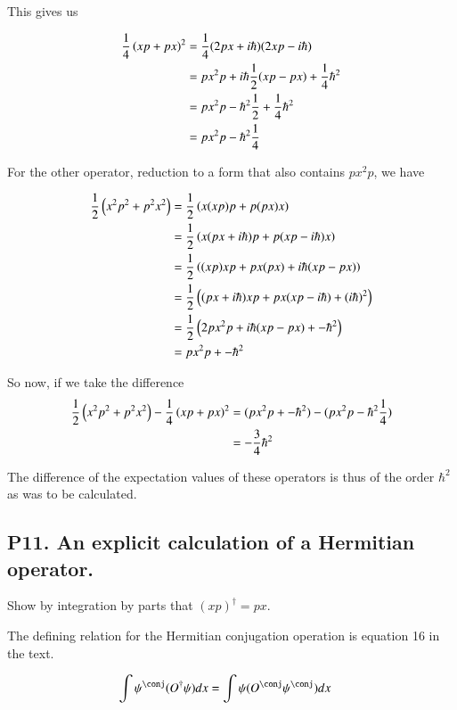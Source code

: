 \documentclass{article}
\begin{document}
This gives us

\begin{align*}
\frac{1}{4}\left(x p + p x \right)^2 
&= \frac{1}{4}(2 p x + i \hbar)( 2 x p - i \hbar ) \\
&= p x^2 p + i\hbar \frac{1}{2}(x p - p x) + \frac{1}{4} \hbar^2 \\
&= p x^2 p - \hbar^2 \frac{1}{2} + \frac{1}{4} \hbar^2 \\
&= p x^2 p - \hbar^2 \frac{1}{4} \\
\end{align*}

For the other operator, reduction to a form that also contains $p x^2 p$, we have

\begin{align*}
\frac{1}{2}\left(x^2 p^2 + p^2 x^2 \right)
&=
\frac{1}{2}\left(x (x p) p + p (p x) x \right) \\
&=
\frac{1}{2}\left(x (p x + i \hbar) p + p (x p -i\hbar) x \right) \\
&=
\frac{1}{2}\left((x p) x p + p x (p x) + i \hbar ( x p - p x ) \right) \\
&=
\frac{1}{2}\left((p x + i\hbar) x p + p x ( x p - i\hbar) + (i \hbar)^2 \right) \\
&=
\frac{1}{2}\left( 2 p x^2 p + i \hbar ( x p - p x) + -\hbar^2 \right) \\
&=
p x^2 p + -\hbar^2 
\end{align*}

So now, if we take the difference 
\begin{align*}
\frac{1}{2}\left(x^2 p^2 + p^2 x^2 \right) - \frac{1}{4}\left(x p + p x \right)^2 
&= (p x^2 p + -\hbar^2 ) - (p x^2 p - \hbar^2 \frac{1}{4}) 
 \\
&= -\frac{3}{4}\hbar^2 
 \\
\end{align*}

The difference of the expectation values of these operators is thus of the order $\hbar^2$ as was to be calculated.

\subsection{P11.  An explicit calculation of a Hermitian operator. }

Show by integration by parts that $(xp)^\dagger = p x$.

The defining relation for the Hermitian conjugation operation is equation 16 in the text.

\begin{align*}
\int \psi^\conj (O^\dagger \psi) dx &= \int \psi (O^\conj \psi^\conj) dx
\end{align*}
\end{document}
